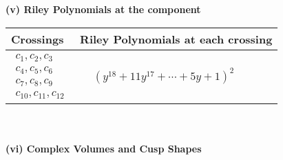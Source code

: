 \documentclass[1p]{elsarticle_modified}
\theoremstyle{definition}
\begin{document}
\newpage\renewcommand{\arraystretch}{1}
\flushleft \textbf{(v) Riley Polynomials at the component}\newline \\
\begin{tabular}{m{50pt}|m{274pt}}
Crossings & \hspace{64pt}Riley Polynomials at each crossing \\
\hline $$\begin{aligned}c_{1},c_{2},c_{3}\\c_{4},c_{5},c_{6}\\c_{7},c_{8},c_{9}\\c_{10},c_{11},c_{12}\end{aligned}$$&$\begin{aligned}
&(y^{18}+11 y^{17}+\cdots+5 y+1)^{2}
\end{aligned}$\\
\hline
\end{tabular}\\~\\
\newpage\flushleft \textbf{(vi) Complex Volumes and Cusp Shapes}
\end{document}
